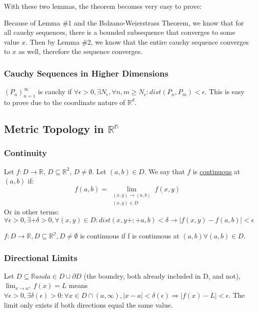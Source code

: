 \vspace{0.3cm}

With these two lemmas, the theorem becomes very easy to prove:

Because of Lemma \#1 and the Bolzano-Weierstrass Theorem, we know that for all
cauchy sequences, there is a bounded subsequence that converges to some value
$x$. Then by Lemma \#2, we know that the entire cauchy sequence converges to $x$
as well, therefore the sequence converges. 

\subsubsection{Cauchy Sequences in Higher Dimensions}

$(P_n)_{n=1}^\infty$ is cauchy if $\forall \epsilon > 0, \exists N_\epsilon, \forall n, m \geq N_\epsilon: dist(P_n, P_m) < \epsilon$.
This is easy to prove due to the coordinate nature of $\mathbb{R}^d$.

\subsection{Metric Topology in $\mathbb{R^n}$}
\subsubsection{Continuity}
Let $f: D\to\mathbb{R}$, $D\subseteq\mathbb{R}^2$, $D\neq\emptyset$. Let $(a, b)\in D$. We say that $f$ is \underline{continuous} at $(a, b)$ if:
$$f(a, b) = \lim_{\substack{(x, y)\to(a,b)\\(x, y)\in D}} f(x, y)$$
Or in other terms:
$$\forall \epsilon > 0, \exists+ \delta>0, \forall (x, y)\in D: dist(x,
y+;+a,b) < \delta \to |f(x,y) - f(a,b)| < \epsilon$$

$f:D \to \mathbb{R}, D \subseteq \mathbb{R^2}, D \neq \emptyset$ is continuous if f is continuous at $(a, b) \forall (a, b) \in D.$

\subsubsection{Directional Limits}
Let $D \subseteq \mathbb{R} and a \in D \cup \partial D$ (the boundry, both already included in D, and not), $\lim_{x \to a^+} f(x) = L$ means $\forall \epsilon > 0, \exists \delta(\epsilon) > 0: \forall x \in D \cap (a, \infty), |x-a| < \delta(\epsilon) \Rightarrow |f(x) - L| < \epsilon$. The limit only exists if both directions equal the same value.

